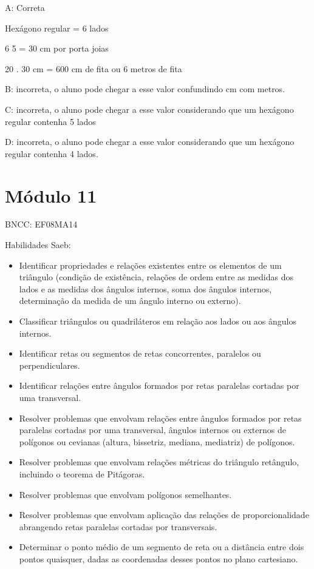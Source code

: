 A: Correta

Hexágono regular = 6 lados

\num{6} 5 = 30 cm por porta joias

20 . 30 cm = 600 cm de fita ou 6 metros de fita

B: incorreta, o aluno pode chegar a esse valor confundindo cm com
metros.

C: incorreta, o aluno pode chegar a esse valor considerando que um
hexágono regular contenha 5 lados

D: incorreta, o aluno pode chegar a esse valor considerando que um
hexágono regular contenha 4 lados.

\hypertarget{muxf3dulo-11}{%
\section{Módulo 11}\label{muxf3dulo-11}}

BNCC: EF08MA14

Habilidades Saeb:

\begin{itemize}
\item
  Identificar propriedades e relações existentes entre os elementos de
  um triângulo (condição de existência, relações de ordem entre as
  medidas dos lados e as medidas dos ângulos internos, soma dos ângulos
  internos, determinação da medida de um ângulo interno ou externo).
\item
  Classificar triângulos ou quadriláteros em relação aos lados ou aos
  ângulos internos.
\item
  Identificar retas ou segmentos de retas concorrentes, paralelos ou
  perpendiculares.
\item
  Identificar relações entre ângulos formados por retas paralelas
  cortadas por uma transversal.
\item
  Resolver problemas que envolvam relações entre ângulos formados por
  retas paralelas cortadas por uma transversal, ângulos internos ou
  externos de polígonos ou cevianas (altura, bissetriz, mediana,
  mediatriz) de polígonos.
\item
  Resolver problemas que envolvam relações métricas do triângulo
  retângulo, incluindo o teorema de Pitágoras.
\item
  Resolver problemas que envolvam polígonos semelhantes.
\item
  Resolver problemas que envolvam aplicação das relações de
  proporcionalidade abrangendo retas paralelas cortadas por
  transversais.
\item
  Determinar o ponto médio de um segmento de reta ou a distância entre
  dois pontos quaisquer, dadas as coordenadas desses pontos no plano
  cartesiano.
\end{itemize}


